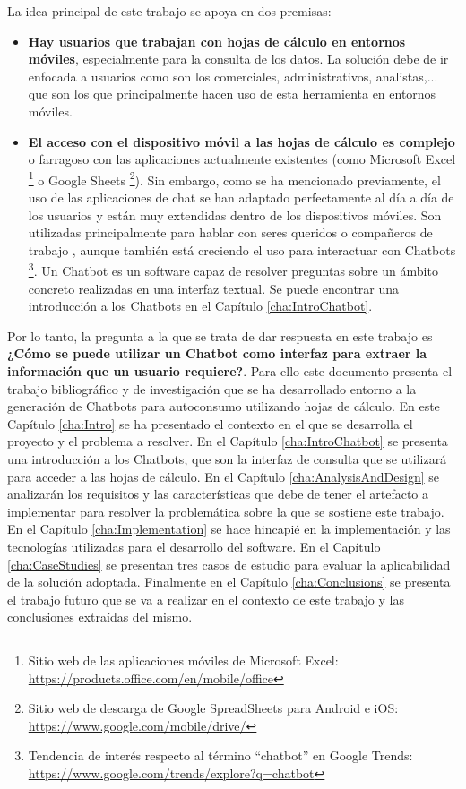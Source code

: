 La idea principal de este trabajo se apoya en dos premisas:
\begin{itemize}
	\item \textbf{Hay usuarios que trabajan con hojas de cálculo en entornos móviles}, especialmente para la consulta de los datos. La solución debe de ir enfocada a usuarios como son los comerciales, administrativos, analistas,... que son los que principalmente hacen uso de esta herramienta en entornos móviles.
	
	\item \textbf{El acceso con el dispositivo móvil a las hojas de cálculo es complejo} o farragoso con las aplicaciones actualmente existentes (como Microsoft Excel \footnote{Sitio web de las aplicaciones móviles de Microsoft Excel: \url{https://products.office.com/en/mobile/office}} o Google Sheets \footnote{Sitio web de descarga de Google SpreadSheets para Android e iOS: \url{https://www.google.com/mobile/drive/}}). Sin embargo, como se ha mencionado previamente, el uso de las aplicaciones de chat se han adaptado perfectamente al día a día de los usuarios y están muy extendidas dentro de los dispositivos móviles. Son utilizadas principalmente para hablar con seres queridos o compañeros de trabajo \cite{Montag2015}, aunque también está creciendo el uso para interactuar con Chatbots \footnote{Tendencia de interés respecto al término ``chatbot'' en Google Trends: \url{https://www.google.com/trends/explore?q=chatbot}}. Un Chatbot es un software capaz de resolver preguntas sobre un ámbito concreto realizadas en una interfaz textual. Se puede encontrar una introducción a los Chatbots en el Capítulo \ref{cha:IntroChatbot}.
\end{itemize}

Por lo tanto, la pregunta a la que se trata de dar respuesta en este trabajo es \textbf{¿Cómo se puede utilizar un Chatbot como interfaz para extraer la información que un usuario requiere?}. Para ello este documento presenta el trabajo bibliográfico y de investigación que se ha desarrollado entorno a la generación de Chatbots para autoconsumo utilizando hojas de cálculo. En este Capítulo \ref{cha:Intro} se ha presentado el contexto en el que se desarrolla el proyecto y el problema a resolver. En el Capítulo \ref{cha:IntroChatbot} se presenta una introducción a los Chatbots, que son la interfaz de consulta que se utilizará para acceder a las hojas de cálculo. En el Capítulo \ref{cha:AnalysisAndDesign} se analizarán los requisitos y las características que debe de tener el artefacto a implementar para resolver la problemática sobre la que se sostiene este trabajo. En el Capítulo \ref{cha:Implementation} se hace hincapié en la implementación y las tecnologías utilizadas para el desarrollo del software. En el Capítulo \ref{cha:CaseStudies} se presentan tres casos de estudio para evaluar la aplicabilidad de la solución adoptada. Finalmente en el Capítulo \ref{cha:Conclusions} se presenta el trabajo futuro que se va a realizar en el contexto de este trabajo y las conclusiones extraídas del mismo.
